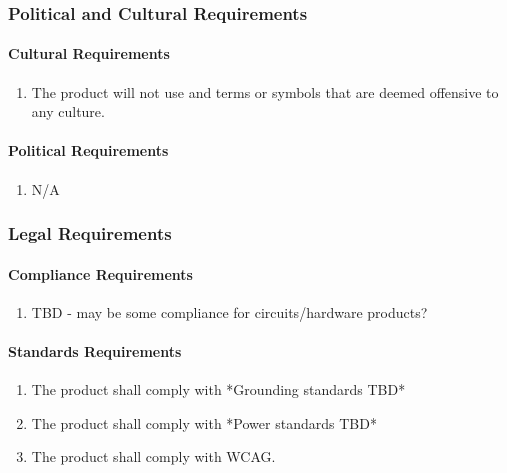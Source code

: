 \documentclass[12pt]{article}
\begin{document}
\subsubsection{Political and Cultural Requirements}
\label{NFR_PC}
\paragraph{Cultural Requirements}
\begin{enumerate}[{PC}1., leftmargin=2\parindent]
    \item The product will not use and terms or symbols that are deemed offensive to any culture.
\end{enumerate}

\paragraph{Political Requirements}
\begin{enumerate}[{PC}1., leftmargin=2\parindent, resume]
    \item N/A
\end{enumerate}



\subsubsection{Legal Requirements}
\label{NFR_Legal}
\paragraph{Compliance Requirements}
\begin{enumerate}[{LR}1., leftmargin=2\parindent]
    \item TBD - may be some compliance for circuits/hardware products?
\end{enumerate}

\paragraph{Standards Requirements}
\begin{enumerate}[{LR}1., leftmargin=2\parindent, resume]
    \item The product shall comply with *Grounding standards TBD*
    \item The product shall comply with *Power standards TBD*
    \item The product shall comply with WCAG. \cite{WCAG2018}
\end{enumerate}
\end{document}
